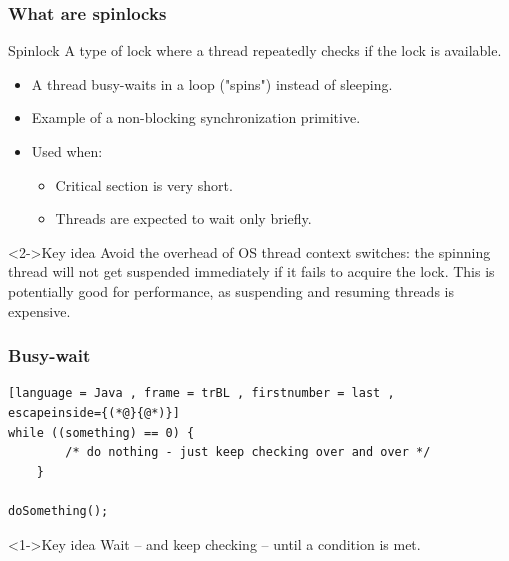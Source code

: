 \documentclass[xcolor={dvipsnames,svgnames},aspectratio=169]{beamer}
\begin{document}
\begin{frame}[fragile]
  \frametitle{What are spinlocks}

  \begin{block}{\faLock\quad Spinlock}
    A type of lock where a thread repeatedly checks if the lock is available.
  \end{block}

  \begin{itemize}
  \item[\faBook]<1-> A thread busy-waits in a loop ("spins") instead of sleeping.
  \item[\faBook]<1-> Example of a non-blocking synchronization primitive.
  \item[\faBook]<1-> Used when:
    \begin{itemize}
    \item[\faCheck] Critical section is very short.
    \item[\faCheck] Threads are expected to wait only briefly.
    \end{itemize}
  \end{itemize}

  \begin{block}<2->{\faLightbulb \quad Key idea}
    Avoid the overhead of OS thread context switches: the spinning thread will
    not get suspended immediately if it fails to acquire the lock. This is
    potentially good for performance, as suspending and resuming threads is
    expensive.
  \end{block}
\end{frame}

\begin{frame}[fragile]
  \frametitle{Busy-wait}

\begin{lstlisting}[language = Java , frame = trBL , firstnumber = last ,
escapeinside={(*@}{@*)}]
while ((something) == 0) {
        /* do nothing - just keep checking over and over */
    }

doSomething();
\end{lstlisting}

  \vspace{0.2cm}
  \begin{block}<1->{\faLightbulb \quad Key idea}
    Wait -- and keep checking -- until a condition is met.
  \end{block}
\end{frame}
\end{document}

